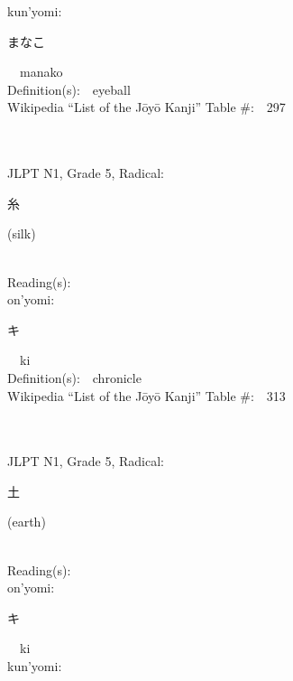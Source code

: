\begin{multicols}{2}
{\hspace*{1em}}kun'yomi:\ \ \\
{\hspace*{2em}}{\begin{CJK}{UTF8}{min} まなこ \end{CJK}}\ \ manako\ \ \\
Definition(s):\ \ eyeball \\
Wikipedia ``List of the J\=oy\=o Kanji'' Table \#:\ \ 297 \\
\ \ \\
{\fontsize{34pt}{40pt}  }\ \ \\  %
{JLPT N1, Grade 5, Radical:\ \ {\begin{CJK}{UTF8}{min} 糸 \end{CJK}} (silk) } \\
Reading(s):\ \ \\
{\hspace*{1em}}on'yomi:\ \ \\
{\hspace*{2em}}{\begin{CJK}{UTF8}{min} キ \end{CJK}}\ \ ki\ \ \\
Definition(s):\ \ chronicle \\
Wikipedia ``List of the J\=oy\=o Kanji'' Table \#:\ \ 313 \\
\ \ \\
{\fontsize{34pt}{40pt}  }\ \ \\  %
{JLPT N1, Grade 5, Radical:\ \ {\begin{CJK}{UTF8}{min} 土 \end{CJK}} (earth) } \\
Reading(s):\ \ \\
{\hspace*{1em}}on'yomi:\ \ \\
{\hspace*{2em}}{\begin{CJK}{UTF8}{min} キ \end{CJK}}\ \ ki\ \ \\
{\hspace*{1em}}kun'yomi:\ \ \\

\end{multicols}
